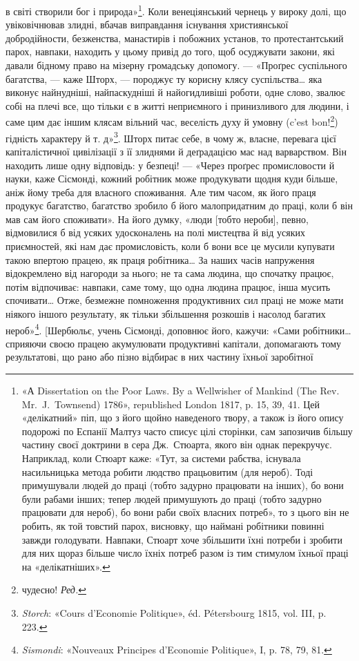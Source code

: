 \parcont{}  %
в світі створили бог і природа»\footnote{
«А Dissertation on the Poor Laws. By a Wellwisher of Mankind
(The Rev. Mr.~J.~Townsend) 1786», republished London 1817, p. 15, 39,
41. Цей «делікатний» піп, що з його щойно наведеного твору, а також із
його опису подорожі по Еспанії Малтуз часто списує цілі сторінки, сам
запозичив більшу частину своєї доктрини в сера Дж.~Стюарта, якого він
однак перекручує. Наприклад, коли Стюарт каже: «Тут, за системи рабства,
існувала насильницька метода робити людство працьовитим (для
нероб). Тоді примушували людей до праці (тобто задурно працювати на
інших), бо вони були рабами інших; тепер людей примушують до праці
(тобто задурно працювати для нероб), бо вони раби своїх власних потреб»,
то з цього він не робить, як той товстий парох, висновку, що наймані
робітники повинні завжди голодувати. Навпаки, Стюарт хоче збільшити
їхні потреби і зробити для них щораз більше число їхніх потреб разом
із тим стимулом їхньої праці на «делікатніших».
}. Коли венеціянський чернець
у вироку долі, що увіковічнював злидні, вбачав виправдання
існування християнської добродійности, безженства, манастирів
і побожних установ, то протестантський парох, навпаки, находить
у цьому привід до того, щоб осуджувати закони, які давали бідному
право на мізерну громадську допомогу. — «Проґрес суспільного
багатства, — каже Шторх, — породжує ту корисну клясу суспільства\dots{}
яка виконує найнудніші, найпаскудніші й найогидливіші
роботи, одне слово, звалює собі на плечі все, що тільки є в житті
неприємного і принизливого для людини, і саме цим дає іншим
клясам вільний час, веселість духу й умовну (c’est bon!\footnote*{
чудесно! \emph{Ред.}
}) гідність
характеру й т. д»\footnote{
\emph{Storch}: «Cours d’Economie Politique», éd. Pétersbourg 1815, vol. III,
p. 223.
}. Шторх питає себе, в чому ж, власне,
перевага цієї капіталістичної цивілізації з її злиднями й деґрадацією
мас над варварством. Він находить лише одну відповідь:
у безпеці! — «Через проґрес промисловости й науки, каже Сісмонді,
кожний робітник може продукувати щодня куди більше,
аніж йому треба для власного споживання. Але тим часом, як
його праця продукує багатство, багатство зробило б його малопридатним
до праці, коли б він мав сам його споживати». На його
думку, «люди [тобто нероби], певно, відмовилися б від усяких
удосконалень на полі мистецтва й від усяких приємностей, які
нам дає промисловість, коли б вони все це мусили купувати
такою впертою працею, як праця робітника\dots{} За наших часів
напруження відокремлено від нагороди за нього; не та сама людина,
що спочатку працює, потім відпочиває: навпаки, саме
тому, що одна людина працює, інша мусить спочивати\dots{} Отже,
безмежне помноження продуктивних сил праці не може мати
ніякого іншого результату, як тільки збільшення розкошів і
насолод багатих нероб»\footnote{
\emph{Sismondi}: «Nouveaux Principes d’Economie Politique», I, p. 78,
79, 81.
}. [Шербюльє, учень Сісмонді, доповнює
його, кажучи: «Сами робітники\dots{} сприяючи своєю працею акумулювати
продуктивні капітали, допомагають тому результатові,
що рано або пізно відбирає в них частину їхньої заробітної
\parbreak{}  %
